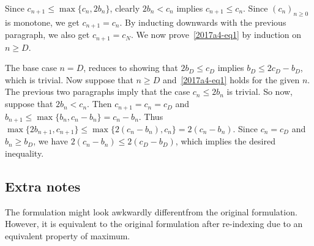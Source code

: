 Since $c_{n + 1} \leq \max\{c_n, 2 b_n\}$, clearly $2 b_n < c_n$ implies $c_{n + 1} \leq c_n$.
Since $(c_n)_{n \geq 0}$ is monotone, we get $c_{n + 1} = c_n$.
By inducting downwards with the previous paragraph, we also get $c_{n + 1} = c_N$.
We now prove~\eqref{2017a4-eq1} by induction on $n \geq D$.

The base case $n = D$, reduces to showing that $2 b_D \leq c_D$ implies $b_D \leq 2 c_D - b_D$, which is trivial.
Now suppose that $n \geq D$ and~\eqref{2017a4-eq1} holds for the given $n$.
The previous two paragraphs imply that the case $c_n \leq 2 b_n$ is trivial.
So now, suppose that $2 b_n < c_n$.
Then $c_{n + 1} = c_n = c_D$ and $b_{n + 1} \leq \max\{b_n, c_n - b_n\} = c_n - b_n$.
Thus $\max\{2 b_{n + 1}, c_{n + 1}\} \leq \max\{2 (c_n - b_n), c_n\} = 2 (c_n - b_n)$.
Since $c_n = c_D$ and $b_n \geq b_D$, we have $2 (c_n - b_n) \leq 2 (c_D - b_D)$, which implies the desired inequality.



\subsection*{Extra notes}

The formulation might look awkwardly differentfrom the original formulation.
However, it is equivalent to the original formulation after re-indexing due to an equivalent property of maximum.
